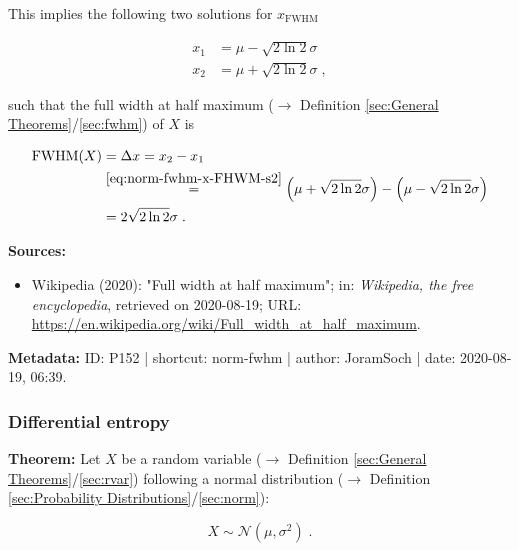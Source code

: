\documentclass[a4paper,12pt,twoside]{book}
\begin{document}
This implies the following two solutions for $x_\mathrm{FWHM}$

\begin{equation} \label{eq:norm-fwhm-x-FHWM-s2}
\begin{split}
x_1 &= \mu - \sqrt{2 \ln 2} \sigma \\
x_2 &= \mu + \sqrt{2 \ln 2} \sigma \; ,
\end{split}
\end{equation}

such that the full width at half maximum ($\rightarrow$ Definition \ref{sec:General Theorems}/\ref{sec:fwhm}) of $X$ is

\begin{equation} \label{eq:norm-fwhm-norm-fwhm-qed}
\begin{split}
\mathrm{FWHM}(X) &= \Delta x = x_2 - x_1 \\
&\overset{\eqref{eq:norm-fwhm-x-FHWM-s2}}{=} \left( \mu + \sqrt{2 \ln 2} \sigma \right) - \left( \mu - \sqrt{2 \ln 2} \sigma \right) \\
&= 2 \sqrt{2 \ln 2} \sigma \; .
\end{split}
\end{equation}


\vspace{1em}
\textbf{Sources:}
\begin{itemize}
\item Wikipedia (2020): "Full width at half maximum"; in: \textit{Wikipedia, the free encyclopedia}, retrieved on 2020-08-19; URL: \url{https://en.wikipedia.org/wiki/Full_width_at_half_maximum}.
\end{itemize}


\vspace{1em}
\textbf{Metadata:} ID: P152 | shortcut: norm-fwhm | author: JoramSoch | date: 2020-08-19, 06:39.
\vspace{1em}



\subsubsection[\textbf{Differential entropy}]{Differential entropy} \label{sec:norm-dent}
\setcounter{equation}{0}

\textbf{Theorem:} Let $X$ be a random variable ($\rightarrow$ Definition \ref{sec:General Theorems}/\ref{sec:rvar}) following a normal distribution ($\rightarrow$ Definition \ref{sec:Probability Distributions}/\ref{sec:norm}):

\begin{equation} \label{eq:norm-dent-norm}
X \sim \mathcal{N}(\mu, \sigma^2) \; .
\end{equation}
\end{document}
